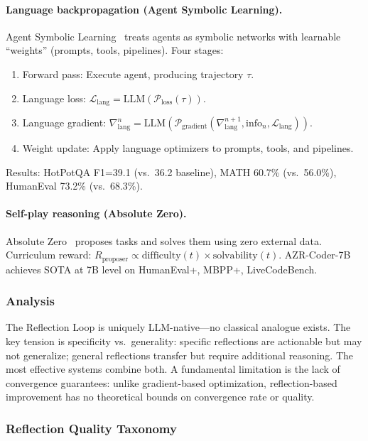 \paragraph{Language backpropagation (Agent Symbolic Learning).}
Agent Symbolic Learning~\citep{zhou2024agentsymbolic} treats agents as symbolic networks with learnable ``weights'' (prompts, tools, pipelines). Four stages:
\begin{enumerate}
    \item Forward pass: Execute agent, producing trajectory $\tau$.
    \item Language loss: $\mathcal{L}_{\text{lang}} = \text{LLM}(\mathcal{P}_{\text{loss}}(\tau))$.
    \item Language gradient: $\nabla_{\text{lang}}^n = \text{LLM}(\mathcal{P}_{\text{gradient}}(\nabla_{\text{lang}}^{n+1}, \text{info}_n, \mathcal{L}_{\text{lang}}))$.
    \item Weight update: Apply language optimizers to prompts, tools, and pipelines.
\end{enumerate}
Results: HotPotQA F1=39.1 (vs.\ 36.2 baseline), MATH 60.7\% (vs.\ 56.0\%), HumanEval 73.2\% (vs.\ 68.3\%).

\paragraph{Self-play reasoning (Absolute Zero).}
Absolute Zero~\citep{zhao2025absolutezero} proposes tasks and solves them using zero external data. Curriculum reward: $R_{\text{proposer}} \propto \text{difficulty}(t) \times \text{solvability}(t)$. AZR-Coder-7B achieves SOTA at 7B level on HumanEval+, MBPP+, LiveCodeBench.

\subsubsection{Analysis}

The Reflection Loop is uniquely LLM-native---no classical analogue exists. The key tension is specificity vs.\ generality: specific reflections are actionable but may not generalize; general reflections transfer but require additional reasoning. The most effective systems combine both. A fundamental limitation is the lack of convergence guarantees: unlike gradient-based optimization, reflection-based improvement has no theoretical bounds on convergence rate or quality.

\subsubsection{Reflection Quality Taxonomy}

